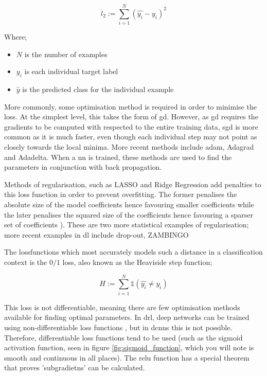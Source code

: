 \begin{equation}
l_2 := \sum_{i = 1}^N (\hat{y_i} - y_i)^2
\end{equation}

Where;

\begin{itemize}
\item $N$ is the number of examples  
\item $y_i$ is each individual target label  
\item $\hat{y}$ is the predicted class for the individual example 
\end{itemize}

More commonly, some optimisation method is required in order to minimise the \gls{loss}.  At the simplest level, this takes the form of \gls{gd}. However, as \gls{gd} requires the gradients to be computed with respected to the entire training data, \gls{sgd} is more common as it is much faster, even though each individual step may not point as closely towards the local minima. More recent methods include  \gls{adam}, Adagrad and Adadelta. When a \gls{nn} is trained, these methods are used to find the parameters in conjunction with back propagation.  %




Methods of regularisation, such as LASSO and Ridge Regression add penalties to this loss function in order to prevent overfitting. The former penalises the absolute size of the model coefficients hence favouring smaller coefficients while the later penalises the squared size of the coefficients hence favouring a sparser set of coefficients \cite{ridge_lasso}). These are two more statistical examples of regularisation; more recent examples in \gls{dl} include drop-out, ZAMBINGO \bigskip

The \gls{lossfunction}s which most accurately models such a distance in a classification context is the $0/1$ loss, also known as the Heaviside step function;

\begin{equation}
H := \sum_{i = 1}^N \mathds{1} (\hat{y_i} \neq y_i)  
\end{equation}

This loss is not differentiable, meaning there are few optimisation methods available for finding optimal parameters. In \gls{drl}, deep networks can be trained using non-differentiable loss functions \cite{drl_non_differentiable}, but in \gls{dcnn}s this is not possible. Therefore, differentiable loss functions tend to be used (such as the sigmoid activation function, seen in figure \ref{fig:sigmoid_function}, which you will note is smooth and continuous in all places). The \gls{relu} function has a special theorem that proves 'subgradietns' can be calculated.

